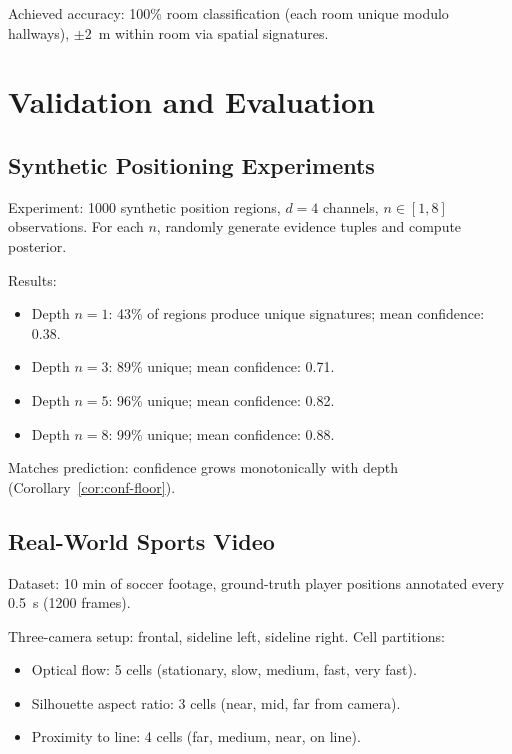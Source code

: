 \documentclass[twocolumn,10pt]{article}
\begin{document}
Achieved accuracy: 100\% room classification (each room unique modulo
hallways), $\pm 2$~m within room via spatial signatures.

\section{Validation and Evaluation}
\label{sec:eval}

\subsection{Synthetic Positioning Experiments}

Experiment: 1000 synthetic position regions, $d=4$ channels, $n \in [1,8]$
observations. For each $n$, randomly generate evidence tuples and compute
posterior.

Results:
\begin{itemize}[leftmargin=1.5em,topsep=2pt,itemsep=1pt]
  \item Depth $n=1$: 43\% of regions produce unique signatures; mean
    confidence: 0.38.
  \item Depth $n=3$: 89\% unique; mean confidence: 0.71.
  \item Depth $n=5$: 96\% unique; mean confidence: 0.82.
  \item Depth $n=8$: 99\% unique; mean confidence: 0.88.
\end{itemize}

Matches prediction: confidence grows monotonically with depth (Corollary~\ref{cor:conf-floor}).

\subsection{Real-World Sports Video}

Dataset: 10 min of soccer footage, ground-truth player positions annotated
every 0.5~s (1200 frames).

Three-camera setup: frontal, sideline left, sideline right. Cell partitions:
\begin{itemize}[leftmargin=1.5em,topsep=2pt,itemsep=1pt]
  \item Optical flow: 5 cells (stationary, slow, medium, fast, very fast).
  \item Silhouette aspect ratio: 3 cells (near, mid, far from camera).
  \item Proximity to line: 4 cells (far, medium, near, on line).
\end{itemize}
\end{document}
